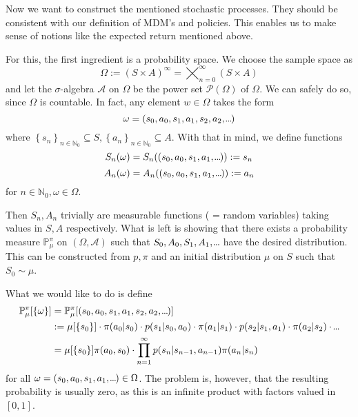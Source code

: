 Now we want to construct the mentioned stochastic processes. They should be consistent with our definition of MDM's and policies. This enables us to make sense of notions like the expected return mentioned above.

For this, the first ingredient is a probability space. We choose the sample space as 
\[
    \Omega := (S \times A)^\infty = \bigtimes_{n=0}^{\infty} (S \times A)
\]
and let the \( \sigma \)-algebra \( \mathcal{A} \) on \( \Omega \) be the power set \( \mathcal{P}(\Omega) \) of \( \Omega \). We can safely do so, since \( \Omega \) is countable. In fact, any element \( w \in \Omega  \) takes the form 
\[
    \omega = (s_{0},a_{0},s_{1},a_{1},s_{2},a_{2},\kern-0.10em.\kern-0.06em.\kern-0.06em.\kern-0.1em)
\]  
where \(  \left\{ s_n \right\}_{n \in \mathbb{N}_{0}} \subseteq S, \left\{ a_n \right\}_{n \in \mathbb{N}_{0}} \subseteq A \). With that in mind, we define functions
\[
    S_n(\omega) = S_n((s_{0},a_{0},s_{1},a_{1},\kern-0.10em.\kern-0.06em.\kern-0.06em.\kern-0.1em)) := s_n
\]
\[
    A_n(\omega) = A_n((s_{0},a_{0},s_{1},a_{1},\kern-0.10em.\kern-0.06em.\kern-0.06em.\kern-0.1em)) := a_n  
\]
for \( n \in \mathbb{N}_{0}, \omega \in \Omega \). 

Then \( S_n, A_n \) trivially are measurable functions ( = random variables) taking values in \( S, A \) respectively.  What is left is showing that there exists a probability measure \( \mathbb{P}^\pi_\mu \) on \( (\Omega, \mathcal{A}) \) such that 
\( S_{0},A_{0}, S_{1},A_{1},\kern-0.10em.\kern-0.06em.\kern-0.06em.\kern-0.1em \) have the desired distribution.
This can be constructed from \( p, \pi \)  and an initial distribution \( \mu \) on \( S \) such that \( S_{0} \sim \mu \).

What we would like to do is define
\begin{align*}
    \mathbb{P}_\mu^\pi [\left\{ \omega \right\}] &= \mathbb{P}_\mu^\pi[{(s_{0},a_{0},s_{1},a_{1},s_{2},a_{2},\kern-0.10em.\kern-0.06em.\kern-0.06em.\kern-0.1em)}] \\
    &:= \mu[\left\{ s_{0} \right\}] \cdot \pi(a_{0} | s_{0}) \cdot p(s_{1} | s_{0},a_{0}) \cdot \pi(a_{1} | s_{1}) \cdot p(s_{2}|s_{1},a_{1}) \cdot \pi(a_{2}|s_{2}) \cdot \kern-0.10em.\kern-0.06em.\kern-0.06em.\kern-0.1em \\
    &= \mu[\left\{ s_{0} \right\}] \pi(a_{0},s_{0}) \cdot \prod_{n=1}^\infty p(s_n | s_{n-1}, a_{n-1}) \pi(a_n | s_n) \\
\end{align*}
for all \( \omega = (s_{0},a_{0},s_{1},a_{1},\kern-0.10em.\kern-0.06em.\kern-0.06em.\kern-0.1em) \in \Omega \).
The problem is, however, that the resulting probability is usually zero, as this is an infinite product with factors valued in \( \left[ 0,1 \right] \).

